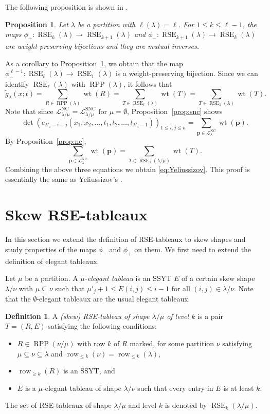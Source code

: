\documentclass{amsart}
\numberwithin{equation}{section}
\newtheorem{prop}[thm]{Proposition}
\theoremstyle{definition}
\newtheorem{defn}[thm]{Definition}
\newcommand\LL{\mathcal{L}_\lm}
\renewcommand\L{\mathcal{L}}
\newcommand\lsnc{\LL^{\operatorname{SNC}}}
\newcommand\lnc{\LL^{\operatorname{NC}}}
\newcommand\row{\operatorname{row}}
\newcommand\pd{\phi_+}
\newcommand\pu{\phi_-}
\newcommand\RSE{\operatorname{RSE}}
\newcommand\RPP{\operatorname{RPP}}
\newcommand\pp{\mathbf{p}}
\newcommand\lm{{\lambda/\mu}}
\renewcommand\gg{\widetilde{g}}
\newcommand\wt{\operatorname{wt}}
\begin{document}
The following proposition is shown in \cite[Proof of Theorem~9.8]{LP2007}.

\begin{prop}\label{prop:inverse}
  Let $\lambda$ be a partition with $\ell(\lambda)=\ell$. For $1\le k\le \ell-1$,
  the maps $\pd:\RSE_{k}(\lambda)\to \RSE_{k+1}(\lambda)$ and
  $\pu:\RSE_{k+1}(\lambda)\to \RSE_{k}(\lambda)$ are weight-preserving bijections
  and they are mutual inverses.
\end{prop}


As a corollary to Proposition~\ref{prop:inverse}, we obtain that the map
$\pu^{\ell-1}:\RSE_\ell(\lambda)\to\RSE_1(\lambda)$ is a weight-preserving bijection.
Since we can identify $\RSE_\ell(\lambda)$ with $\RPP(\lambda)$, it follows that
\[
  \gg_\lambda(x;t) = \sum_{R\in\RPP(\lambda)} \wt(R)= \sum_{T\in\RSE_\ell(\lambda)}
  \wt(T)= \sum_{T\in\RSE_1(\lambda)} \wt(T).
\]
Note that since $\lnc=\lsnc$ for $\mu=\emptyset$, Proposition~\ref{prop:snc} shows
\[
  \det \left( e_{\lambda'_i-i+j}(x_1,x_2,\dots,t_{1},t_{2},\dots,
    t_{\lambda'_i-1}) \right)_{1\le i,j\le n} = \sum_{\pp\in
    \L^{\mathrm{NC}}_\lambda} \wt(\pp).
\]
By Proposition~\ref{prop:nc},
\[
\sum_{\pp\in \L^{\mathrm{NC}}_\lambda} \wt(\pp) = \sum_{T\in\RSE_1(\lm)}\wt(T).
\]
Combining the above three equations we obtain \eqref{eq:Yeliussizov}. This proof
is essentially the same as Yeliussizov's \cite[\S 10.1]{Yeliussizov2017}.




\section{Skew RSE-tableaux}
\label{sec:skew-rse-tableaux}

In this section we extend the definition of RSE-tableaux to skew shapes and
study properties of the maps $\pu$ and $\pd$ on them. We first need to extend
the definition of elegant tableaux.

Let $\mu$ be a partition. A \emph{$\mu$-elegant tableau} is an SSYT $E$ of a
certain skew shape $\lambda/\nu$ with $\mu\subseteq\nu$ such that $\mu'_j+1\le
E(i,j)\le i-1$ for all $(i,j)\in \lambda/\nu$. Note that the $\emptyset$-elegant
tableaux are the usual elegant tableaux.


\begin{defn}
  A \emph{(skew) RSE-tableau of shape $\lm$ of level $k$} is a pair $T=(R,E)$
  satisfying the following conditions:
\begin{itemize}
\item $R\in\RPP(\nu/\mu)$ with row $k$ of $R$ marked, for some partition $\nu$
  satisfying $\mu\subseteq\nu\subseteq\lambda$ and $\row_{\le k}(\nu)=\row_{\le
    k}(\lambda)$,
\item $\row_{\ge k}(R)$ is an SSYT, and 
\item $E$ is a $\mu$-elegant tableau of shape $\lambda/\nu$ such that every
  entry in $E$ is at least $k$.
\end{itemize}
The set of RSE-tableaux of shape $\lm$ and level $k$ is denoted by
$\RSE_k(\lm)$.
\end{defn}
\end{document}
